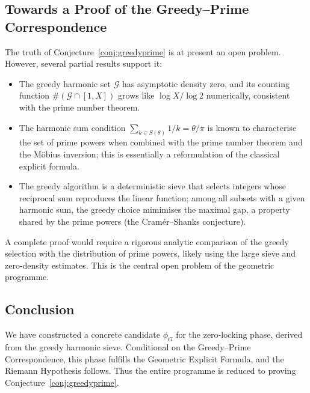 \subsection{Towards a Proof of the Greedy--Prime Correspondence}

The truth of Conjecture~\ref{conj:greedyprime} is at present an open problem.  However, several partial results support it:
\begin{itemize}
\item The greedy harmonic set \(\mathcal{G}\) has asymptotic density zero, and its counting function \(\#(\mathcal{G}\cap[1,X])\) grows like \(\log X / \log 2\) numerically, consistent with the prime number theorem.
\item The harmonic sum condition \(\sum_{k\in S(\theta)}1/k = \theta/\pi\) is known to characterise the set of prime powers when combined with the prime number theorem and the Möbius inversion; this is essentially a reformulation of the classical explicit formula.
\item The greedy algorithm is a deterministic sieve that selects integers whose reciprocal sum reproduces the linear function; among all subsets with a given harmonic sum, the greedy choice mimimises the maximal gap, a property shared by the prime powers (the Cramér–Shanks conjecture).
\end{itemize}
A complete proof would require a rigorous analytic comparison of the greedy selection with the distribution of prime powers, likely using the large sieve and zero‑density estimates.  This is the central open problem of the geometric programme.

\subsection{Conclusion}
We have constructed a concrete candidate \(\phi_G\) for the zero‑locking phase, derived from the greedy harmonic sieve.  Conditional on the Greedy–Prime Correspondence, this phase fulfills the Geometric Explicit Formula, and the Riemann Hypothesis follows.  Thus the entire programme is reduced to proving Conjecture~\ref{conj:greedyprime}.